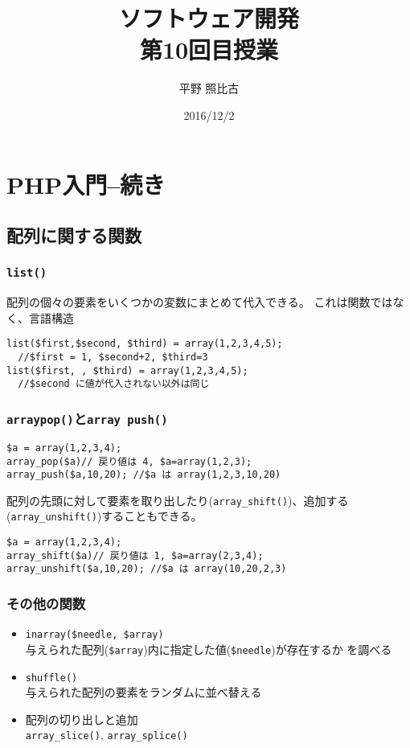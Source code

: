 
\title{ソフトウェア開発\\第10回目授業}
\author{平野 照比古}
\institute{}
\date{2016/12/2}
\newtheorem{Prob}{解説}
\newcommand{\Elm}[1]{\texttt{<#1>}}

\newcommand{\DOMM}{\texttt}
\newcommand{\Event}{\texttt}
\newcommand{\DOMP}{\texttt}
\newcommand{\DOM}{\texttt{DOM}}
\newcommand{\keyitem}{\relax}
\newcommand{\HTML}{HTML文書}

\frame{\maketitle}
\frame{\tableofcontents}
\section{PHP入門--続き}
\subsection{配列に関する関数}
\begin{frame}[containsverbatim]
\frametitle{\texttt{list()}}

  配列の個々の要素をいくつかの変数にまとめて代入できる。
       これは関数ではなく、言語構造
\begin{Verbatim}
list($first,$second, $third) = array(1,2,3,4,5);
  //$first = 1, $second+2, $third=3
list($first, , $third) = array(1,2,3,4,5);
  //$second に値が代入されない以外は同じ
\end{Verbatim}
\end{frame}
\begin{frame}[containsverbatim]
\frametitle{\texttt{array\textunderscore pop()}と\texttt{array\textunderscore
       push()}}
\begin{Verbatim}
$a = array(1,2,3,4);
array_pop($a)// 戻り値は 4, $a=array(1,2,3);
array_push($a,10,20); //$a は array(1,2,3,10,20)
\end{Verbatim}
配列の先頭に対して要素を取り出したり(\verb+array_shift()+)、追加する
 (\verb+array_unshift()+)することもできる。
\begin{verbatim}
$a = array(1,2,3,4);
array_shift($a)// 戻り値は 1, $a=array(2,3,4);
array_unshift($a,10,20); //$a は array(10,20,2,3)
\end{verbatim}
 \end{frame}
 \begin{frame}[containsverbatim]
  \frametitle{その他の関数}
  \begin{itemize}
   \item \texttt{in\textunderscore array(\$needle, \$array)}\\
与えられた配列(\verb+$array+)内に指定した値(\verb+$needle+)が存在するか
         を調べる
 \item \verb+shuffle()+\\
与えられた配列の要素をランダムに並べ替える
 \item 配列の切り出しと追加\\
\verb+array_slice()+, \verb+array_splice()+
  \end{itemize}
 \end{frame}
